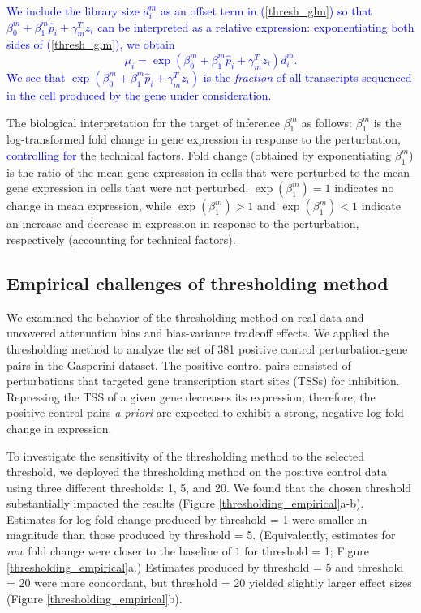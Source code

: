 \documentclass[12pt]{article}
\newcommand{\blue}[1]{\textcolor{blue}{#1}}
\begin{document}
\blue{We include the library size $d^m_i$ as an offset term in (\ref{thresh_glm}) so that $\beta^m_0 + \beta^m_1 \hat{p}_i + \gamma^T_m z_i$ can be interpreted as a relative expression: exponentiating both sides of (\ref{thresh_glm}), we obtain
$$\mu_i = \exp \left( \beta^m_0 + \beta^m_1 \hat{p}_i + \gamma^T_m z_i \right) d_i^m.$$ We see that $\exp \left( \beta^m_0 + \beta^m_1 \hat{p}_i + \gamma^T_m z_i \right)$ is the \textit{fraction} of all transcripts sequenced in the cell produced by the gene under consideration.}

The biological interpretation for the target of inference $\beta^m_1$ as follows:  $\beta^m_1$ is the log-transformed fold change in gene expression in response to the perturbation, \blue{controlling for} the technical factors. Fold change (obtained by exponentiating $\beta^m_1$) is the ratio of the mean gene expression in cells that were perturbed to the mean gene expression in cells that were not perturbed. $\exp(\beta^m_1) = 1$ indicates no change in mean expression, while $\exp(\beta^m_1) > 1$ and $\exp(\beta^m_1) < 1$ indicate an increase and decrease in expression in response to the perturbation, respectively (accounting for technical factors).

\subsection{Empirical challenges of thresholding method}\label{sec:thresholding_empirical}

We examined the behavior of the thresholding method on real data and uncovered attenuation bias and bias-variance tradeoff effects. We applied the thresholding method to analyze the set of 381 positive control perturbation-gene pairs in the Gasperini dataset. The positive control pairs consisted of perturbations that targeted gene transcription start sites (TSSs) for inhibition. Repressing the TSS of a given gene decreases its expression; therefore, the positive control pairs \textit{a priori} are expected to exhibit a strong, negative log fold change in expression.

To investigate the sensitivity of the thresholding method to the selected threshold, we deployed the thresholding method on the positive control data using three different thresholds: 1, 5, and 20. We found that the chosen threshold substantially impacted the results (Figure \ref{thresholding_empirical}a-b). Estimates for log fold change produced by threshold = 1 were smaller in magnitude than those produced by threshold = 5. (Equivalently, estimates for \textit{raw} fold change were closer to the baseline of $1$ for threshold = 1; Figure \ref{thresholding_empirical}a.) Estimates produced by threshold = 5 and threshold = 20 were more concordant, but threshold = 20 yielded slightly larger effect sizes (Figure \ref{thresholding_empirical}b).
\end{document}
